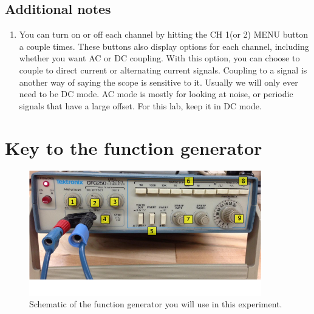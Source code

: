 \subsection*{Additional notes}
\begin{enumerate}
\item You can turn on or off each channel by hitting the CH 1(or 2) MENU button a couple times. These buttons also display options for each channel, including whether you want AC or DC coupling. With this option, you can choose to couple to direct current or alternating current signals. Coupling to a signal is another way of saying the scope is sensitive to it. Usually we will only ever need to be DC mode. AC mode is mostly for looking at noise, or periodic signals that have a large offset. For this lab, keep it in DC mode.
\end{enumerate}

\newpage

\section*{Key to the function generator}

\begin{figure}[h!]
        \centering
            \includegraphics[width=0.9\textwidth]{./Exp1-10/pic/fgen.png}
        \caption{Schematic of the function generator you will use in this experiment.}
        \label{fig:gen}
\end{figure}

